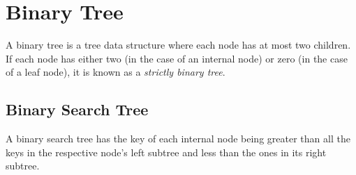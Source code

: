 \section{Binary Tree}

A binary tree is a tree data structure where each node
has at most two children. If each node has either two (in the
case of an internal node) or zero (in the case of a leaf node),
it is known as a \emph{strictly binary tree}.

\subsection{Binary Search Tree}

A binary search tree has the key of each internal node
being greater than all the keys in the respective node's
left subtree and less than the ones in its right subtree.

